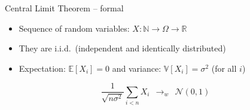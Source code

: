 \documentclass[usepdftitle=false]{beamer}
\newcommand{\Nat}{\mathbb{N}}
\newcommand{\Real}{\mathbb{R}}
\begin{document}
\begin{frame}{Central Limit Theorem -- formal} %

\begin{itemize}

\item Sequence of random variables: $X : \Nat \to \Omega \to \Real$

\item They are i.i.d.\ (independent and identically distributed)

\item Expectation: $\mathbb{E}[X_i] = 0$ and variance: $\mathbb{V}[X_i] = \sigma^2$ (for all $i$)

\end{itemize}

\[ \frac{1}{\sqrt{n \sigma^2}} \sum_{i < n} X_i ~~{\longrightarrow}_w~~ \mathcal{N}(0, 1) \]

\end{frame} %
\end{document}
